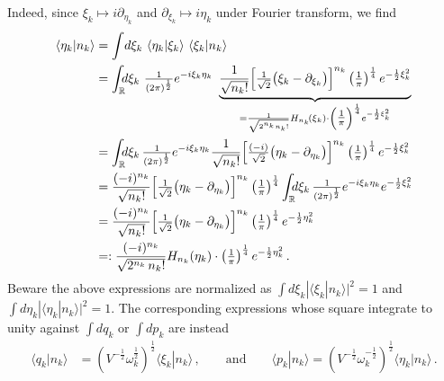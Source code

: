 \documentclass[../QFT_main.tex]{subfiles}
\begin{document}
\begin{mytheorem}
Indeed, since $\xi_k\mapsto i \partial_{\eta_k}$ and $\partial_{\xi_k} \mapsto i \eta_k$ under Fourier transform, we find
\begin{align}
    \langle \eta_{k} | n_k \rangle 
     &= \int \!d \xi_k \, \,\langle \eta_k | \xi_k \rangle \,\,\langle \xi_k | n_k \rangle
     \\
     &= \int_\R\!\!\! d\xi_k\, \,\tfrac{1}{(2\pi)^{\frac{1}{2}}}e^{-i \xi_k\eta_k} \,\,\underbrace{\frac{1}{\sqrt{n_k!}}\Big[\tfrac{1}{\sqrt{2}}\big(\xi_k-\partial_{\xi_k}\big)\Big]^{n_k} \left(\tfrac{1}{\pi}\right)^{\frac{1}{4}} e^{-\frac{1}{2}\xi_k^2}}_{= \frac{1}{\sqrt{2^{n_k}n_k!}} H_{n_k}\!(\xi_k) \cdot \left(\tfrac{1}{\pi}\right)^{\frac{1}{4}} e^{-\frac{1}{2}\xi_k^2}}
     \\
     &= \int_\R\!\!\!  d\xi_k\, \tfrac{1}{(2\pi)^{\frac{1}{2}}}e^{-i \xi_k\eta_k} \frac{1}{\sqrt{n_k!}}\Big[\tfrac{(-i)}{\sqrt{2}}\big(\eta_k-\partial_{\eta_k}\big)\Big]^{n_k} \left(\tfrac{1}{\pi}\right)^{\frac{1}{4}} e^{-\frac{1}{2}\xi_k^2}
     \\
     &= \frac{(-i)^{n_k}}{\sqrt{n_k!}}\Big[\tfrac{1}{\sqrt{2}}\big(\eta_k-\partial_{\eta_k}\big)\Big]^{n_k} \left(\tfrac{1}{\pi}\right)^{\frac{1}{4}} \int_\R\!\!\!  d\xi_k\, \tfrac{1}{(2\pi)^{\frac{1}{2}}}e^{-i \xi_k\eta_k}  e^{-\frac{1}{2}\xi_k^2}
     \\
     &= \frac{(-i)^{n_k}}{\sqrt{n_k!}}\Big[\tfrac{1}{\sqrt{2}}\big(\eta_k-\partial_{\eta_k}\big)\Big]^{n_k} \left(\tfrac{1}{\pi}\right)^{\frac{1}{4}} e^{-\frac{1}{2}\eta_k^2}
     \\
     &=: \frac{(-i)^{n_k}}{\sqrt{2^{n_k}\,n_k!}} H_{n_k}(\eta_k) \cdot \left(\tfrac{1}{\pi}\right)^{\frac{1}{4}} e^{-\frac{1}{2}\eta_k^2}\,.
\end{align}
%
Beware the above expressions are normalized as $\int d\xi_k |\langle \xi_k | n_k \rangle|^2 = 1$ and $\int d\eta_k |\langle \eta_k | n_k \rangle|^2 = 1$.
The corresponding expressions whose square integrate to unity against $\int dq_k$ or $\int dp_k$ are instead
\begin{align}
    \langle q_{k} | n_k \rangle &= \left(V^{-\frac{1}{2}} \omega_k^{\frac{1}{2}}\right)^{\frac{1}{2}} \langle \xi_{k} | n_k \rangle\,, \qquad\text{and}\qquad
    \langle p_{k} | n_k \rangle = \left(V^{-\frac{1}{2}} \omega_k^{-\frac{1}{2}}\right)^{\frac{1}{2}} \langle \eta_{k} | n_k \rangle\,.
\end{align}



\end{mytheorem}
\end{document}
